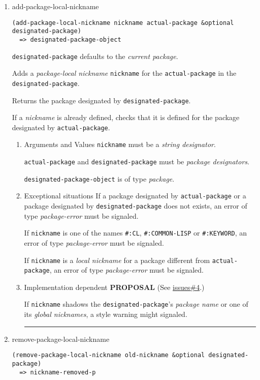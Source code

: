 \documentclass[11pt]{article}
\begin{document}
\begin{enumerate}
\begin{enumerate}
\noindent\rule{\textwidth}{0.5pt}
\end{enumerate}
\item add-package-local-nickname
\label{sec:org3cd3787}
\begin{verbatim}
(add-package-local-nickname nickname actual-package &optional designated-package)
  => designated-package-object
\end{verbatim}

\texttt{designated-package} defaults to the \emph{current package}.

Adds a \emph{package-local nickname} \texttt{nickname} for the \texttt{actual-package} in the
\texttt{designated-package}.

Returns the package designated by \texttt{designated-package}.

If a \emph{nickname} is already defined, checks that it is defined for the
package designated by \texttt{actual-package}.
\begin{enumerate}
\item Arguments and Values
\label{sec:org202d2c5}
\texttt{nickname} must be a \emph{string designator}.

\texttt{actual-package} and \texttt{designated-package} must be \emph{package designators}.

\texttt{designated-package-object} is of type \emph{package}.
\item Exceptional situations
\label{sec:orgaf439b6}
If a package designated by \texttt{actual-package} or a package designated by
\texttt{designated-package} does not exists, an error of type \emph{package-error}
must be signaled.

If \texttt{nickname} is one of the names \texttt{\#:CL}, \texttt{\#:COMMON-LISP} or \texttt{\#:KEYWORD},
an error of type \emph{package-error} must be signaled.

If \texttt{nickname} is a \emph{local nickname} for a package different from
\texttt{actual-package}, an error of type \emph{package-error} must be signaled.
\item Implementation dependent
\label{sec:orgdc23e86}
\textbf{PROPOSAL} (See \hyperref[sec:orgeeb4508]{issues\#4}.)

If \texttt{nickname} shadows the \texttt{designated-package}'s \emph{package name} or one of
its \emph{global nicknames}, a style warning might signaled.

\noindent\rule{\textwidth}{0.5pt}
\end{enumerate}
\item remove-package-local-nickname
\label{sec:org7b7163f}
\begin{verbatim}
(remove-package-local-nickname old-nickname &optional designated-package)
  => nickname-removed-p
\end{verbatim}


\end{enumerate}
\end{document}
